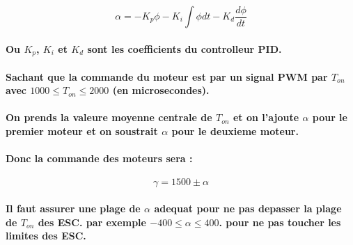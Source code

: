 \begin{equation}
	\alpha = - K_p \phi - K_i \int \phi dt - K_d \frac{d\phi}{dt}
\end{equation}

\paragraph{Ou $K_p$, $K_i$ et $K_d$ sont les coefficients du controlleur PID.}

\paragraph{Sachant que la commande du moteur est par un signal PWM par $T_{on}$ avec $1000 \leq T_{on} \leq 2000$ (en microsecondes).}

\paragraph{On prends la valeure moyenne centrale de $T_{on}$ et on l'ajoute $\alpha$ pour le premier moteur et on soustrait $\alpha$ pour le deuxieme moteur.}

\paragraph{Donc la commande des moteurs sera :}

\begin{equation}
	\gamma = 1500 \pm \alpha
\end{equation}

\paragraph{Il faut assurer une plage de $\alpha$ adequat pour ne pas depasser la plage de $T_{on}$ des ESC. par exemple $ -400 \leq \alpha \leq 400$. pour ne pas toucher les limites des ESC.}
